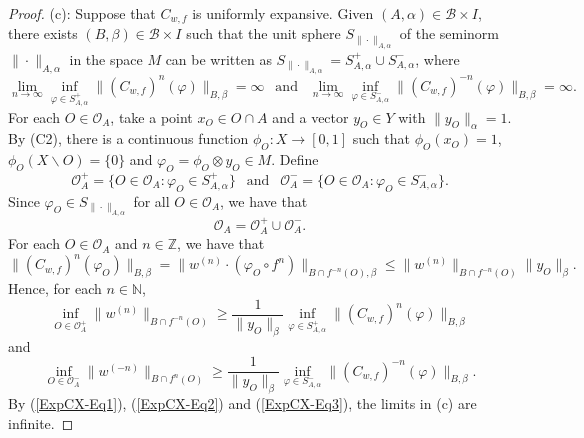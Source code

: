 \documentclass[10pt,a4paper]{amsart}
\newcommand{\N}{\mathbb{N}} %
\newcommand{\Z}{\mathbb{Z}} %
\newcommand{\cB}{\mathcal{B}}
\newcommand{\cO}{\mathcal{O}}
\begin{document}
\begin{proof}
(c): Suppose that $C_{w,f}$ is uniformly expansive. 
Given $(A,\alpha) \in \cB \times I$, there exists $(B,\beta) \in \cB \times I$ such that the unit sphere $S_{\|\cdot\|_{A,\alpha}}$
of the seminorm $\|\cdot\|_{A,\alpha}$ in the space $M$ can be written as
$S_{\|\cdot\|_{A,\alpha}} = S^{+}_{A,\alpha} \cup S^{-}_{A,\alpha}$, where
\begin{equation}\label{ExpCX-Eq1}
\lim_{n \to \infty} \inf_{\varphi \in S^{+}_{A,\alpha}} \|(C_{w,f})^n(\varphi)\|_{B,\beta} = \infty \ \ \text{ and } \ \ 
\lim_{n \to \infty} \inf_{\varphi \in S^{-}_{A,\alpha}} \|(C_{w,f})^{-n}(\varphi)\|_{B,\beta} = \infty.
\end{equation} 
For each $O \in \cO_A$, take a point $x_O \in O \cap A$ and a vector $y_O \in Y$ with $\|y_O\|_\alpha = 1$.
By (C2), there is a continuous function $\phi_O : X \to [0,1]$ such that 
$\phi_O(x_O) = 1$, $\phi_O(X \backslash O) = \{0\}$ and $\varphi_O = \phi_O \otimes y_O \in M$.
Define
\[
\cO_A^+ = \{O \in \cO_A : \varphi_O \in S^{+}_{A,\alpha}\} \ \ \text{ and } \ \
\cO_A^- = \{O \in \cO_A : \varphi_O \in S^{-}_{A,\alpha}\}.
\]
Since $\varphi_O \in S_{\|\cdot\|_{A,\alpha}}$ for all $O \in \cO_A$, we have that
\[
\cO_A = \cO_A^+ \cup \cO_A^-.
\]
For each $O \in \cO_A$ and $n \in \Z$, we have that
\[
\|(C_{w,f})^n(\varphi_O)\|_{B,\beta} = \|w^{(n)} \cdot (\varphi_O \circ f^n)\|_{B \cap f^{-n}(O),\beta} 
  \leq \|w^{(n)}\|_{B \cap f^{-n}(O)} \|y_O\|_\beta.
\]
Hence, for each $n \in \N$,
\begin{equation}\label{ExpCX-Eq2}
\inf_{O \in \cO_A^+} \|w^{(n)}\|_{B\cap f^{-n}(O)} 
  \geq \frac{1}{\|y_O\|_\beta} \inf_{\varphi \in S^{+}_{A,\alpha}} \|(C_{w,f})^n(\varphi)\|_{B,\beta}
\end{equation}
and
\begin{equation}\label{ExpCX-Eq3}
\inf_{O \in \cO_A^-} \|w^{(-n)}\|_{B\cap f^{n}(O)} 
  \geq \frac{1}{\|y_O\|_\beta} \inf_{\varphi \in S^{-}_{A,\alpha}} \|(C_{w,f})^{-n}(\varphi)\|_{B,\beta}.
\end{equation}
By (\ref{ExpCX-Eq1}), (\ref{ExpCX-Eq2}) and (\ref{ExpCX-Eq3}), the limits in (c) are infinite.


\end{proof}
\end{document}

